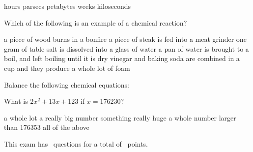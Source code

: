 \documentclass[11pt,addpoints]{exam}   	%
\begin{document}
\begin{questions}
\begin{choices}
 hours
 parsecs
 petabytes
 weeks
 kiloseconds
\end{choices}
\vspace{.2in}

\question[5]
Which of the following is an example of a chemical reaction?

\begin{choices}
\choice a piece of wood burns in a bonfire
\choice a piece of steak is fed into a meat grinder
\choice one gram of table salt is dissolved into a glass of water
\choice a pan of water is brought to a boil, and left boiling until it is dry
\choice vinegar and baking soda are combined in a cup and they produce a whole lot of foam
\end{choices}
\vspace{.2in}
\pagebreak

\question
Balance the following chemical equations:
\vspace{.2in}

\question[1] 
What is $2x^2 + 13x + 123$ if $ x = 176230 $?

\begin{choices}
\choice a whole lot
\choice a really big number
\choice something really huge
\choice a whole number larger than 176353
\choice all of the above
\end{choices}

\end{questions}

\vspace{2in}

\begin{center}
This exam has \numquestions\ questions for a total of \numpoints\ points.
\end{center}
\end{document}
